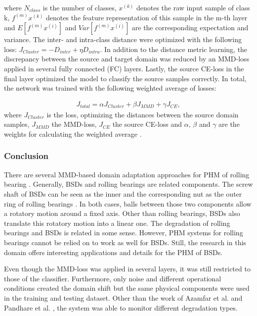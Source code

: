 where $N_{class}$ is the number of classes, $x^{(k)}$ denotes the raw input sample of class k, $f^{(m)}x^{(k)}$ denotes the feature representation of this sample in the m-th layer and $E[f^{(m)}x^{(i)}]$ and $Var[f^{(m)}x^{(i)}]$ are the corresponding expectation and variance. The inter- and intra-class distance were optimized with the following loss: $J_{Cluster} = - D_{inter} + \eta D_{intra}$. In addition to the distance metric learning, the discrepancy between the source and target domain was reduced by an MMD-loss applied in several fully connected (FC) layers. Lastly, the source CE-loss in the final layer optimized the model to classify the source samples correctly. In total, the network was trained with the following weighted average of losses: 

\begin{equation}
    \begin{aligned}
    J_{total} = \alpha J_{Cluster} + \beta J_{MMD} + \gamma J_{CE}, 
    \end{aligned}
\end{equation}
where $J_{Cluster}$ is the loss, optimizing the distances between the source domain samples, $J_{MMD}$ the MMD-loss, $J_{CE}$ the source CE-loss and $\alpha$, $\beta$ and $\gamma$ are the weights for calculating the weighted average \cite{Li2018}.

\subsubsection{Conclusion}
There are several MMD-based domain adaptation approaches for PHM of rolling bearing \cite{AN201942} \cite{Li2018} \cite{Guo2019} \cite{Singh2019} \cite{Kang2020}. Generally, BSDs and rolling bearings are related components. The screw shaft of BSDs can be seen as the inner and the corresponding nut as the outer ring of rolling bearings \cite{Lee2015}. In both cases, balls between those two components allow a rotatory motion around a fixed axis. Other than rolling bearings, BSDs also translate this rotatory motion into a linear one. The degradation of rolling bearings and BSDs is related in some sense. However, PHM systems for rolling bearings cannot be relied on to work as well for BSDs. Still, the research in this domain offers interesting applications and details for the PHM of BSDs. 

Even though the MMD-loss was applied in several layers, it was still restricted to those of the classifier. Furthermore, only noise and different operational conditions created the domain shift but the same physical components were used in the training and testing dataset. Other than the work of Azamfar et al. \cite{AZAMFAR2020103932} and Pandhare et al. \cite{Pandhare2021}, the system was able to monitor different degradation types.

